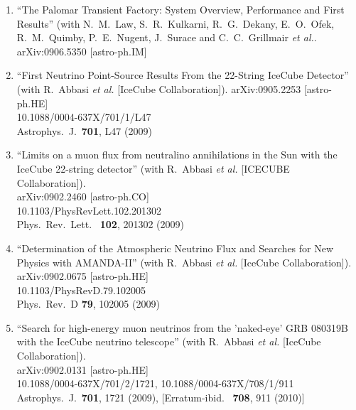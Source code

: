\begin{enumerate}
\item ``The Palomar Transient Factory: System Overview, Performance and
  First Results'' (with N.~M.~Law, S.~R.~Kulkarni, R.~G.~Dekany,
  E.~O.~Ofek, R.~M.~Quimby, P.~E.~Nugent, J.~Surace and
  C.~C.~Grillmair {\it et al.}.  \\{}arXiv:0906.5350 [astro-ph.IM]
  


\item ``First Neutrino Point-Source Results From the 22-String IceCube
  Detector'' (with R.~Abbasi {\it et al.}  [IceCube Collaboration]). arXiv:0905.2253 [astro-ph.HE] \\{}10.1088/0004-637X/701/1/L47
  \\{}Astrophys.\ J.\ {\bf 701}, L47 (2009) %



\item ``Limits on a muon flux from neutralino annihilations in the Sun with
  the IceCube 22-string detector'' (with R.~Abbasi {\it et al.}
  [ICECUBE Collaboration]).  \\{}arXiv:0902.2460 [astro-ph.CO]
  \\{}10.1103/PhysRevLett.102.201302 \\{}Phys.\ Rev.\ Lett.\ {\bf
    102}, 201302 (2009) %


\item ``Determination of the Atmospheric Neutrino Flux and Searches for New
  Physics with AMANDA-II'' (with R.~Abbasi {\it et al.}  [IceCube
    Collaboration]).  \\{}arXiv:0902.0675 [astro-ph.HE]
  \\{}10.1103/PhysRevD.79.102005 \\{}Phys.\ Rev.\ D {\bf 79}, 102005
  (2009) %


\item ``Search for high-energy muon neutrinos from the 'naked-eye' GRB
  080319B with the IceCube neutrino telescope'' (with R.~Abbasi {\it et
    al.}  [IceCube Collaboration]).  \\{}arXiv:0902.0131 [astro-ph.HE]
  \\{}10.1088/0004-637X/701/2/1721, 10.1088/0004-637X/708/1/911
  \\{}Astrophys.\ J.\ {\bf 701}, 1721 (2009), [Erratum-ibid.\ {\bf
      708}, 911 (2010)] %



\end{enumerate}
